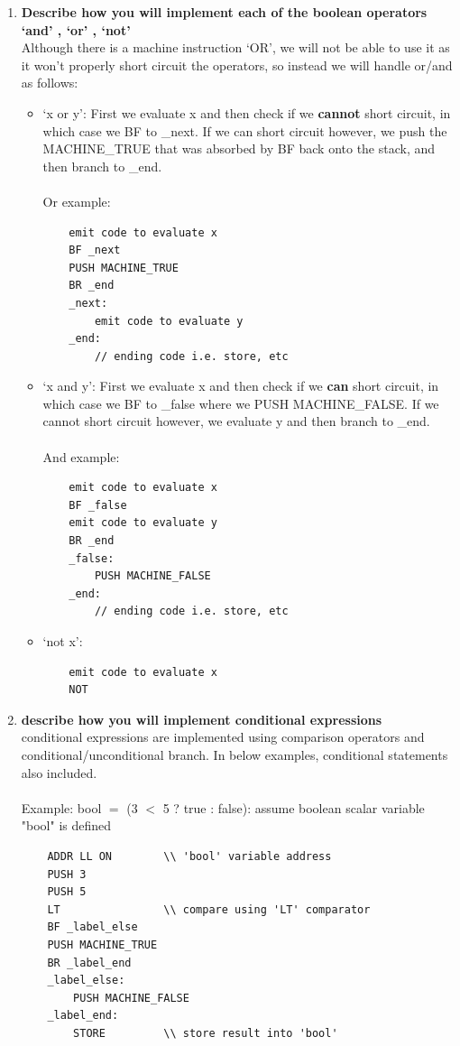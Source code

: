 \documentclass[11pt]{article}
\begin{document}
\begin{enumerate}[label=(\alph*)]
\item \textbf{Describe how you will implement each of the boolean operators `and' , `or' , `not'}\\
Although there is a machine instruction `OR', we will not be able to use it as it won't properly short circuit the operators, so instead we will handle or/and as follows:
\begin{itemize}
\item `x or y': First we evaluate x and then check if we \textbf{cannot} short circuit, in which case we BF to \_next. If we can short circuit however, we push the MACHINE\_TRUE that was absorbed by BF back onto the stack, and then branch to \_end.\\
\\
Or example:
\begin{lstlisting}
    emit code to evaluate x
    BF _next
    PUSH MACHINE_TRUE
    BR _end
    _next:
        emit code to evaluate y
    _end:
        // ending code i.e. store, etc
\end{lstlisting}
\item `x and y': First we evaluate x and then check if we \textbf{can} short circuit, in which case we BF to \_false where we PUSH MACHINE\_FALSE. If we cannot short circuit however, we evaluate y and then branch to \_end.\\
\\
And example:
\begin{lstlisting}
    emit code to evaluate x
    BF _false
    emit code to evaluate y
    BR _end
    _false:
    	PUSH MACHINE_FALSE
    _end:
    	// ending code i.e. store, etc
\end{lstlisting}

\item `not x':
\begin{lstlisting}
    emit code to evaluate x
    NOT
\end{lstlisting}
\end{itemize}

\item \textbf{describe how you will implement conditional
	expressions}\\
conditional expressions are implemented using comparison operators 
and conditional/unconditional branch. In below examples, conditional
statements also included.\\
\\
Example: bool $=$ (3 $<$ 5 ? true : false): 
assume boolean scalar variable "bool" is defined
\begin{lstlisting}
    ADDR LL ON        \\ 'bool' variable address
    PUSH 3            
    PUSH 5
    LT                \\ compare using 'LT' comparator
    BF _label_else    
    PUSH MACHINE_TRUE
    BR _label_end
    _label_else:
        PUSH MACHINE_FALSE
    _label_end:
        STORE         \\ store result into 'bool'
\end{lstlisting}

\end{enumerate}
\end{document}
